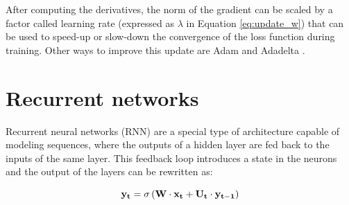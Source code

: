 After computing the derivatives, the norm of the gradient can be scaled by a factor called learning rate (expressed as $\lambda$ in Equation \ref{eq:update_w}) that can be used to speed-up or slow-down the convergence of the loss function during training. Other ways to improve this update are Adam \cite{kingma2014adam} and Adadelta \cite{zeiler2012adadelta}.




\section{Recurrent networks}

Recurrent neural networks (RNN) are a special type of architecture capable of modeling sequences, where the outputs of a hidden layer are fed back to the inputs of the same layer. This feedback loop introduces a state in the neurons and the output of the layers can be rewritten as:

\begin{equation}
    \centering
    \mathbf{y_t} = \sigma \left ( \mathbf{W} \cdot \mathbf{x_t} + \mathbf{U_t} \cdot \mathbf{y_{t-1}} \right )
    \label{eq:out-rec}
\end{equation}

